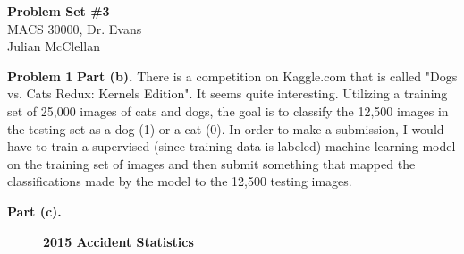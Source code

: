 \documentclass[letterpaper,12pt]{article}
\theoremstyle{definition}
\begin{document}
\begin{flushleft}
  \textbf{\large{Problem Set \#3}} \\
  MACS 30000, Dr. Evans \\
  Julian McClellan
\end{flushleft}

\vspace{5mm}

\noindent\textbf{Problem 1} 
\newline
\noindent\textbf{Part (b).} 
There is a competition on Kaggle.com that is called "Dogs vs. Cats Redux: Kernels Edition".
It seems quite interesting. Utilizing a training set of 25,000 images of cats 
and dogs, the goal is to classify the 12,500 images in the testing set as a dog
(1) or a cat (0). In order to make a submission, I would have to train a
supervised (since training data is labeled) machine learning model on the 
training set of images and then submit something that mapped the classifications
made by the model to the 12,500 testing images.

\newline
\noindent\textbf{Part (c).} 
\begin{figure}[h!]\centering\captionsetup{width=4.0in}
  \caption{\textbf{2015 Accident Statistics}}\label{accidents}
\end{figure}
\end{document}
